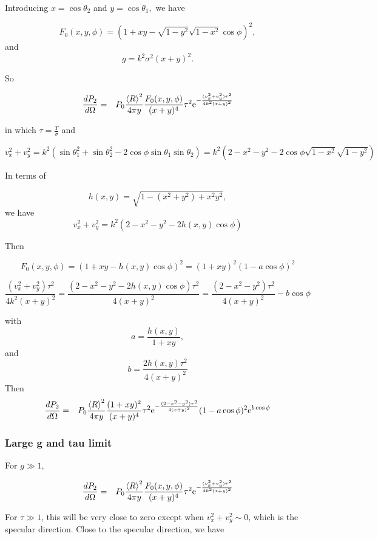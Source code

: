\documentclass[11pt]{article}
\newcommand{\der}[2]{\frac{d {#1}}{d {#2}}}
\newcommand{\e}{{\rm e}}
\begin{document}
{{{{Introducing $x=\cos\theta_{2}$ and $y=\cos\theta_{1},$ we have

$$F_{0}(x,y,\phi)=\left(1+xy-\sqrt{1-y^{2}}\sqrt{1-x^{2}}\cos\phi\right)^{2},$$
and
$$g=k^{2}\sigma^{2}(x+y)^{2}.$$

So

\begin{eqnarray}
\der{P_{2}}{\Omega}&=&P_{0}\frac{\left<R\right>^{2}}{4\pi y}\frac{F_{0}(x,y,\phi)}{(x+y)^{4}}\tau^{2}\e^{-\frac{(v_{x}^{2}+v_{y}^{2})\tau^{2}}{4k^{2}(x+y)^{2}}}\end{eqnarray}

in which $\tau=\frac{T}{\sigma}$
and

$$v_{x}^{2}+v_{y}^{2}=k^{2}\left(\sin\theta_{1}^{2}+\sin\theta_{2}^{2}-2\cos\phi\sin\theta_{1}\sin\theta_{2}\right)=k^{2}\left(2-x^{2}-y^{2}-2\cos\phi\sqrt{1-x^{2}}\sqrt{1-y^{2}}\right)$$

In terms of 

$$h(x,y)=\sqrt{1-(x^{2}+y^{2})+x^{2}y^{2}},$$
we have
$$v_{x}^{2}+v_{y}^{2}=k^{2}\left(2-x^{2}-y^{2}-2h(x,y)\cos\phi\right)$$

Then

$$F_{0}(x,y,\phi)=\left(1+xy-h(x,y)\cos\phi\right)^{2}=(1+xy)^{2}(1-a\cos\phi)^{2}$$

$$\frac{(v_{x}^{2}+v_{y}^{2})\tau^{2}}{4k^{2}(x+y)^{2}}=\frac{\left(2-x^{2}-y^{2}-2h(x,y)\cos\phi\right)\tau^{2}}{4(x+y)^{2}}=\frac{\left(2-x^{2}-y^{2}\right)\tau^{2}}{4(x+y)^{2}}-b\cos\phi$$

with
$$a=\frac{h(x,y)}{1+xy},$$
and
$$b=\frac{2h(x,y)\tau^{2}}{4(x+y)^{2}}$$
Then
\begin{eqnarray}\der{P_{2}}{\Omega}
&=&P_{0}\frac{\left<R\right>^{2}}{4\pi y}\frac{(1+xy)^{2}}{(x+y)^{4}}\tau^{2}\e^{-\frac{(2-x^{2}-y^{2})\tau^{2}}{4(x+y)^{2}}}(1-a\cos\phi)^{2}\e^{b\cos\phi}\end{eqnarray}

\subsubsection{Large g and tau limit}
For $g\gg 1$,

\begin{eqnarray}
\der{P_{2}}{\Omega}&=&P_{0}\frac{\left<R\right>^{2}}{4\pi y}\frac{F_{0}(x,y,\phi)}{(x+y)^{4}}\tau^{2}\e^{-\frac{(v_{x}^{2}+v_{y}^{2})\tau^{2}}{4k^{2}(x+y)^{2}}}\end{eqnarray}

For $\tau\gg 1$, this will be very close to zero except when $v_{x}^{2}+v_{y}^{2}\sim0$, which is the specular direction. Close to the specular direction, we have

}}}}
\end{document}
